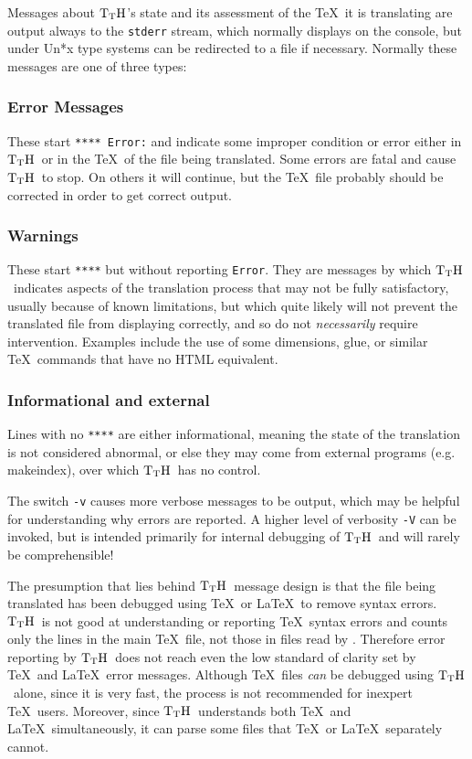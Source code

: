 \documentclass[12pt]{article}
\def\TtH{$\rm{}T_TH$}
\begin{document}
Messages about \TtH's state and its assessment of the \TeX\ it is
translating are output always to the \verb!stderr! stream, which
normally displays on the console, but under Un*x type systems can be
redirected to a file if necessary. Normally these messages are one of
three types:

\subsubsection*{Error Messages} 
These start \verb!**** Error:! and indicate some improper condition or
error either in \TtH\ or in the \TeX\ of the file being
translated. Some errors are fatal and cause \TtH\ to stop. On others
it will continue, but the \TeX\ file probably should be corrected in
order to get correct output.

\subsubsection*{Warnings}
These start \verb!****! but without reporting \verb!Error!. They are
messages by which \TtH\ indicates aspects of the translation process
that may not be fully satisfactory, usually because of known limitations,
but which quite likely will not prevent the translated file from
displaying correctly, and so do not {\em necessarily} require
intervention. Examples include the use of some dimensions, glue, or similar
\TeX\ commands that have no HTML equivalent. 

\subsubsection*{Informational and external}
Lines with no \verb!****! are either informational, meaning the state
of the translation is not considered abnormal, or else they may come
from external programs (e.g. makeindex), over which \TtH\ has no
control.

The switch \verb!-v! causes more verbose messages to be output, which
may be helpful for understanding why errors are reported. A higher
level of verbosity \verb!-V! can be invoked, but is intended primarily
for internal debugging of \TtH\ and will rarely be comprehensible!

The presumption that lies behind \TtH\ message design is that the file
being translated has been debugged using \TeX\ or \LaTeX\ to remove
syntax errors. \TtH\ is not good at understanding or reporting \TeX\
syntax errors and counts only the lines in the main \TeX\ file, not
those in files read by \verb!!. Therefore error reporting by
\TtH\ does not reach even the low standard of clarity set by \TeX\ and
\LaTeX\ error messages. Although \TeX\ files {\em can} be debugged using
\TtH\ alone, since it is very fast, the process is not recommended for
inexpert \TeX\ users. Moreover, since \TtH\ understands both \TeX\ and
\LaTeX\ simultaneously, it can parse some files that \TeX\ or \LaTeX\ 
separately cannot.
\end{document}
